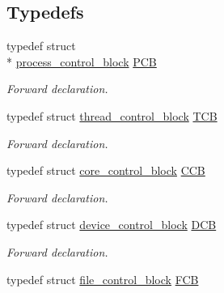 \subsection*{Typedefs}
\begin{DoxyCompactItemize}
\item 
\hypertarget{group__rlists_ga91aaadf0c3f9cef2293a99c69795323f}{typedef struct \\*
\hyperlink{structprocess__control__block}{process\-\_\-control\-\_\-block} \hyperlink{group__rlists_ga91aaadf0c3f9cef2293a99c69795323f}{P\-C\-B}}\label{group__rlists_ga91aaadf0c3f9cef2293a99c69795323f}

\begin{DoxyCompactList}\small\item\em Forward declaration. \end{DoxyCompactList}\item 
\hypertarget{group__rlists_ga8e5eca0c5ec064a81ae9246c7d4f32ef}{typedef struct \hyperlink{structthread__control__block}{thread\-\_\-control\-\_\-block} \hyperlink{group__rlists_ga8e5eca0c5ec064a81ae9246c7d4f32ef}{T\-C\-B}}\label{group__rlists_ga8e5eca0c5ec064a81ae9246c7d4f32ef}

\begin{DoxyCompactList}\small\item\em Forward declaration. \end{DoxyCompactList}\item 
\hypertarget{group__rlists_gac3d551eb0caa1296280ea2278b4f1b11}{typedef struct \hyperlink{structcore__control__block}{core\-\_\-control\-\_\-block} \hyperlink{group__rlists_gac3d551eb0caa1296280ea2278b4f1b11}{C\-C\-B}}\label{group__rlists_gac3d551eb0caa1296280ea2278b4f1b11}

\begin{DoxyCompactList}\small\item\em Forward declaration. \end{DoxyCompactList}\item 
\hypertarget{group__rlists_ga5b4de7b0c72db6219c5a6dda2466181f}{typedef struct \hyperlink{structdevice__control__block}{device\-\_\-control\-\_\-block} \hyperlink{group__rlists_ga5b4de7b0c72db6219c5a6dda2466181f}{D\-C\-B}}\label{group__rlists_ga5b4de7b0c72db6219c5a6dda2466181f}

\begin{DoxyCompactList}\small\item\em Forward declaration. \end{DoxyCompactList}\item 
\hypertarget{group__rlists_ga60c6c294fa1d8ea73ed270404fe5c17d}{typedef struct \hyperlink{structfile__control__block}{file\-\_\-control\-\_\-block} \hyperlink{group__rlists_ga60c6c294fa1d8ea73ed270404fe5c17d}{F\-C\-B}}\label{group__rlists_ga60c6c294fa1d8ea73ed270404fe5c17d}


\end{DoxyCompactItemize}
